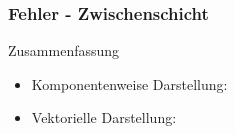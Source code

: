 \begin{frame}
\frametitle{Fehler - Zwischenschicht} 
\vspace{-10mm}


\vspace{-7mm}


\begin{block}{Zusammenfassung}
\begin{itemize}
\item Komponentenweise Darstellung: 
\end{itemize}

\begin{itemize}
\item Vektorielle Darstellung: 
\end{itemize}

\end{block}
\end{frame}



